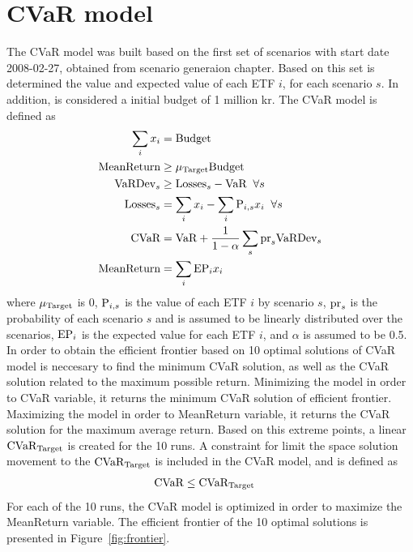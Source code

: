 \section{CVaR model}\label{sec:CVaR}

The CVaR model was built based on the first set of scenarios with start date 2008-02-27, obtained from scenario generaion chapter. Based on this set is determined the value and expected value of each ETF $i$, for each scenario $s$. In addition, is considered a initial budget of 1 million kr. The CVaR model is defined as
\begin{align}
\sum_{i} x_{i} &= \textup{Budget} \\
\textup{MeanReturn} &\ge \mu_{\textup{Target}} \textup{Budget} \\
\textup{VaRDev}_{s} &\ge \textup{Losses}_{s} - \textup{VaR} \; \; \forall s \\
\textup{Losses}_{s} &= \sum_{i} x_{i} - \sum_{i} \textup{P}_{i,s} x_{i} \; \; \forall s \\
\textup{CVaR} &= \textup{VaR} + \frac{1} {1 - \alpha} \sum_{s} \textup{pr}_{s} \textup{VaRDev}_{s} \\
\textup{MeanReturn} &= \sum_{i} \textup{EP}_{i} x_{i}
\end{align}
where $ \mu_{\textup{Target}}$ is 0, $\textup{P}_{i,s}$ is the value of each ETF $i$ by scenario $s$, $\textup{pr}_{s}$ is the probability of each scenario $s$ and is assumed to be linearly distributed over the scenarios, $\textup{EP}_{i}$ is the expected value for each ETF $i$, and $\alpha$ is assumed to be 0.5.
In order to obtain the efficient frontier based on 10 optimal solutions of CVaR model is neccesary to find the minimum CVaR solution, as well as the CVaR solution related to the maximum possible return. Minimizing the model in order to CVaR variable, it returns the minimum CVaR solution of efficient frontier. Maximizing the model in order to MeanReturn variable, it returns the CVaR solution for the maximum average return. Based on this extreme points, a linear $\textup{CVaR}_{\textup{Target}}$ is created for the 10 runs. A constraint for limit the space solution movement to the $\textup{CVaR}_{\textup{Target}}$ is included in the CVaR model, and is defined as
\begin{align}
\textup{CVaR} &\le \textup{CVaR}_{\textup{Target}} 
\end{align}
For each of the 10 runs, the CVaR model is optimized in order to maximize the MeanReturn variable. The efficient frontier of the 10 optimal solutions is presented in Figure~\ref{fig:frontier}. 






